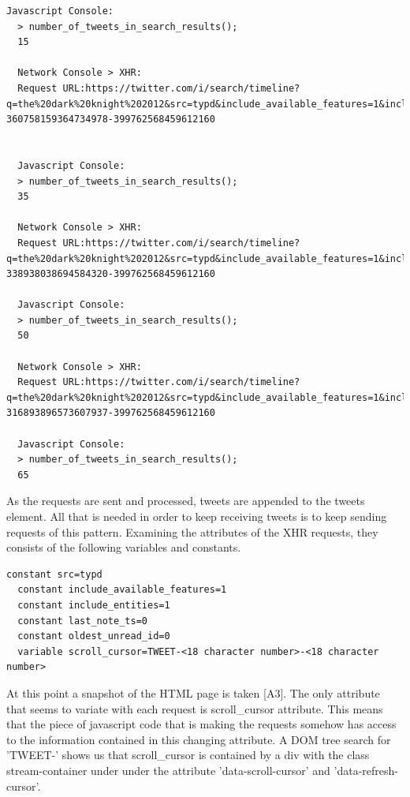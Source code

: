   \begin{lstlisting}[caption={TODO: Caption},label={},captionpos=b]
  Javascript Console:
  > number_of_tweets_in_search_results();
  15

  Network Console > XHR:
  Request URL:https://twitter.com/i/search/timeline?q=the%20dark%20knight%202012&src=typd&include_available_features=1&include_entities=1&last_note_ts=0&scroll_cursor=TWEET-360758159364734978-399762568459612160


  Javascript Console:
  > number_of_tweets_in_search_results();
  35

  Network Console > XHR:
  Request URL:https://twitter.com/i/search/timeline?q=the%20dark%20knight%202012&src=typd&include_available_features=1&include_entities=1&last_note_ts=0&oldest_unread_id=0&scroll_cursor=TWEET-338938038694584320-399762568459612160

  Javascript Console:
  > number_of_tweets_in_search_results();
  50

  Network Console > XHR:
  Request URL:https://twitter.com/i/search/timeline?q=the%20dark%20knight%202012&src=typd&include_available_features=1&include_entities=1&last_note_ts=0&oldest_unread_id=0&scroll_cursor=TWEET-316893896573607937-399762568459612160

  Javascript Console:
  > number_of_tweets_in_search_results();
  65
  \end{lstlisting}

As the requests are sent and processed, tweets are appended to the tweets element. All that is needed in order to keep receiving tweets is to keep sending requests of this pattern.
Examining the attributes of the XHR requests, they consists of the following variables and constants.

  \begin{lstlisting}[caption={TODO: Caption},label={},captionpos=b]
  constant src=typd
  constant include_available_features=1
  constant include_entities=1
  constant last_note_ts=0
  constant oldest_unread_id=0
  variable scroll_cursor=TWEET-<18 character number>-<18 character number>
  \end{lstlisting}

At this point a snapshot of the HTML page is taken [A3]. The only attribute that seems to variate with each request is scroll\_cursor attribute. This means that the piece of javascript code that is making the requests somehow has access to the information contained in this changing attribute. A DOM tree search for 'TWEET-' shows us that scroll\_cursor is contained by a div with the class stream-container under under the attribute 'data-scroll-cursor' and 'data-refresh-cursor'.

